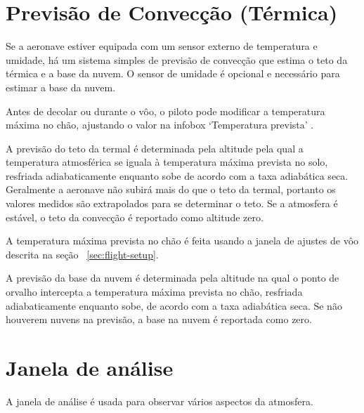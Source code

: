 \section{Previsão de Convecção (Térmica)}\label{sec:convection-forecast}

Se a aeronave estiver equipada com um sensor externo de temperatura e umidade, há um sistema simples de previsão de convecção que estima o teto da térmica e a base da nuvem.  O sensor de umidade é opcional e necessário para estimar a base da nuvem.

Antes de decolar ou durante o vôo, o piloto pode modificar a temperatura máxima no chão, ajustando o valor na infobox ‘Temperatura prevista’  {\InfoBox}.

A previsão do teto da termal é determinada pela altitude pela qual a temperatura atmosférica se iguala à temperatura máxima prevista no solo, resfriada adiabaticamente enquanto sobe de acordo com a taxa adiabática seca.  Geralmente a aeronave não subirá mais do que o teto da termal, portanto os valores medidos são extrapolados para se determinar o teto.  Se a atmosfera é estável, o teto da convecção é reportado como altitude zero.

A temperatura máxima prevista no chão é feita usando a janela de ajustes de vôo descrita na seção 
~\ref{sec:flight-setup}.


%

A previsão da base da nuvem é determinada pela altitude na qual o ponto de orvalho intercepta a temperatura máxima prevista no chão, resfriada adiabaticamente enquanto sobe, de acordo com a taxa adiabática seca.  Se não houverem nuvens na previsão, a base na nuvem é reportada como zero.


\section{Janela de análise}

A janela de análise é usada para observar vários aspectos da atmosfera.

